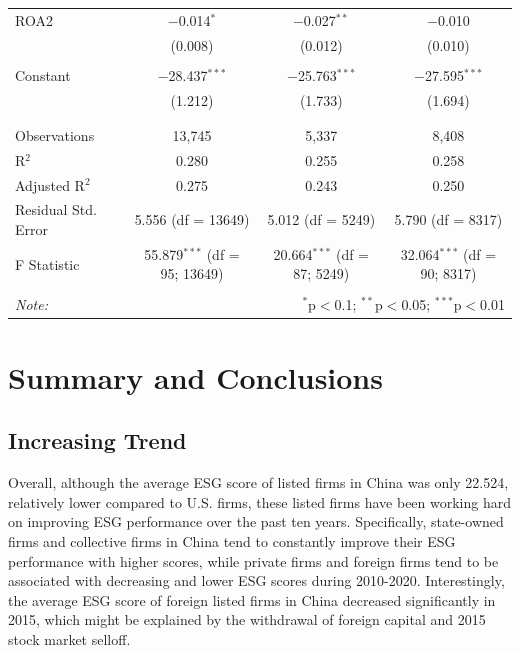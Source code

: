 \documentclass[
  12pt,
]{article}
\begin{document}
\begin{table}[!htbp]
\begin{tabular}{@{\extracolsep{5pt}}lccc}
 ROA2 & $-$0.014$^{*}$ & $-$0.027$^{**}$ & $-$0.010 \\ 
  & (0.008) & (0.012) & (0.010) \\ 
  & & & \\ 
 Constant & $-$28.437$^{***}$ & $-$25.763$^{***}$ & $-$27.595$^{***}$ \\ 
  & (1.212) & (1.733) & (1.694) \\ 
  & & & \\ 
\hline \\[-1.8ex] 
Observations & 13,745 & 5,337 & 8,408 \\ 
R$^{2}$ & 0.280 & 0.255 & 0.258 \\ 
Adjusted R$^{2}$ & 0.275 & 0.243 & 0.250 \\ 
Residual Std. Error & 5.556 (df = 13649) & 5.012 (df = 5249) & 5.790 (df = 8317) \\ 
F Statistic & 55.879$^{***}$ (df = 95; 13649) & 20.664$^{***}$ (df = 87; 5249) & 32.064$^{***}$ (df = 90; 8317) \\ 
\hline 
\hline \\[-1.8ex] 
\textit{Note:}  & \multicolumn{3}{r}{$^{*}$p$<$0.1; $^{**}$p$<$0.05; $^{***}$p$<$0.01} \\ 
\end{tabular} 
\end{table}

\newpage

\hypertarget{summary-and-conclusions}{%
\section{Summary and Conclusions}\label{summary-and-conclusions}}

\hypertarget{increasing-trend}{%
\subsection{Increasing Trend}\label{increasing-trend}}

Overall, although the average ESG score of listed firms in China was
only 22.524, relatively lower compared to U.S. firms, these listed firms
have been working hard on improving ESG performance over the past ten
years. Specifically, state-owned firms and collective firms in China
tend to constantly improve their ESG performance with higher scores,
while private firms and foreign firms tend to be associated with
decreasing and lower ESG scores during 2010-2020. Interestingly, the
average ESG score of foreign listed firms in China decreased
significantly in 2015, which might be explained by the withdrawal of
foreign capital and 2015 stock market selloff.
\end{document}
